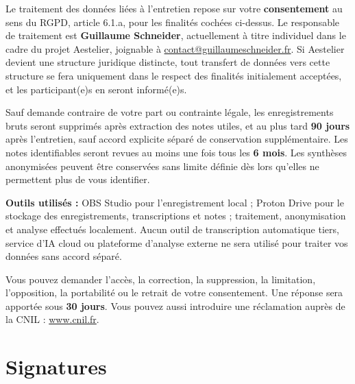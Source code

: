 \documentclass[10pt,a4paper]{article}
\begin{document}
Le traitement des données liées à l'entretien repose sur votre \textbf{consentement} au sens du RGPD, article 6.1.a, pour les finalités cochées ci-dessus. Le responsable de traitement est \textbf{Guillaume Schneider}, actuellement à titre individuel dans le cadre du projet Aestelier, joignable à \href{mailto:contact@guillaumeschneider.fr}{contact@guillaumeschneider.fr}. Si Aestelier devient une structure juridique distincte, tout transfert de données vers cette structure se fera uniquement dans le respect des finalités initialement acceptées, et les participant(e)s en seront informé(e)s.

Sauf demande contraire de votre part ou contrainte légale, les enregistrements bruts seront supprimés après extraction des notes utiles, et au plus tard \textbf{90 jours} après l'entretien, sauf accord explicite séparé de conservation supplémentaire. Les notes identifiables seront revues au moins une fois tous les \textbf{6 mois}. Les synthèses anonymisées peuvent être conservées sans limite définie dès lors qu'elles ne permettent plus de vous identifier.

\textbf{Outils utilisés :} OBS Studio pour l'enregistrement local ; Proton Drive pour le stockage des enregistrements, transcriptions et notes ; traitement, anonymisation et analyse effectués localement. Aucun outil de transcription automatique tiers, service d'IA cloud ou plateforme d'analyse externe ne sera utilisé pour traiter vos données sans accord séparé.

Vous pouvez demander l'accès, la correction, la suppression, la limitation, l'opposition, la portabilité ou le retrait de votre consentement. Une réponse sera apportée sous \textbf{30 jours}. Vous pouvez aussi introduire une réclamation auprès de la CNIL : \href{https://www.cnil.fr}{www.cnil.fr}.

\section{Signatures}

\vspace{0.5em}
\end{document}
